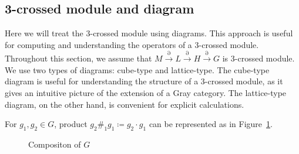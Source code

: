 \documentclass{tac}
\begin{document}
\begin{appendices}
\section{3-crossed module and diagram}
\label{app_dia_3cm}
Here we will treat the 3-crossed module using diagrams.
This approach is useful for computing and understanding the operators of a 3-crossed module.
Throughout this section, we assume that $ M\xrightarrow{\partial}L \xrightarrow{\partial} H \xrightarrow{\partial} G $ is 3-crossed module. We use two types of diagrams: cube-type and lattice-type.
The cube-type diagram is useful for understanding the structure of a 3-crossed module, as it gives an intuitive picture of the extension of a Gray category.
The lattice-type diagram, on the other hand, is convenient for explicit calculations.

For $g_1, g_2 \in G$, product $g_2 \#_1 g_1 \coloneqq g_2\cdot g_1$ can be represented as in Figure~\ref{d:1-mor_comp}.

\begin{figure}[htbp]
\begin{center}
\end{center}
\caption{Compositon of $G$}
\label{d:1-mor_comp}
\end{figure}


\end{appendices}
\end{document}
